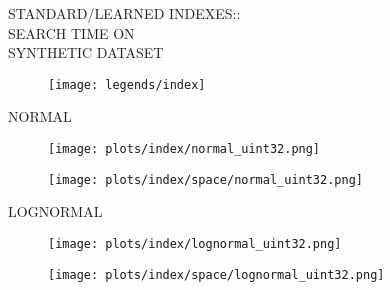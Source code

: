 \documentclass{article}
\begin{document}
\begin{figure}[!htbp]
\fbox
{
\begin{minipage}[t][0.98\textheight][t]{\textwidth}
\centering
\vspace*{-0.2cm}
    \begin{minipage}{0.23\linewidth}
    \footnotesize{STANDARD/LEARNED INDEXES::\\SEARCH TIME ON \\ SYNTHETIC DATASET}
    \end{minipage}
   \begin{minipage}{0.75\linewidth}
        \begin{figure}[H]
        \texttt{[image: legends/index]}
        \end{figure}
    \end{minipage}
    \vspace*{-10px}

    \begin{minipage}{0.05\linewidth}
    \begin{sideways}\small NORMAL\end{sideways}
    \end{minipage}
    \begin{minipage}{0.3\linewidth}
        \begin{figure}[H]
        \texttt{[image: plots/index/normal\_uint32.png]}
        \end{figure}
    \end{minipage}
    \begin{minipage}{0.3\linewidth}
        \begin{figure}[H]
            \texttt{[image: plots/index/space/normal\_uint32.png]}
        \end{figure}
    \end{minipage}
    \vspace*{-20px}

    \begin{minipage}{0.05\linewidth}
    \begin{sideways}\small LOGNORMAL\end{sideways}
    \end{minipage}
    \begin{minipage}{0.3\linewidth}
        \begin{figure}[H]
        \texttt{[image: plots/index/lognormal\_uint32.png]}
        \end{figure}
    \end{minipage}
    \begin{minipage}{0.3\linewidth}
        \begin{figure}[H]
            \texttt{[image: plots/index/space/lognormal\_uint32.png]}
        \end{figure}
    \end{minipage}
    \vspace*{-20px}


\end{minipage}}
\end{figure}
\end{document}
